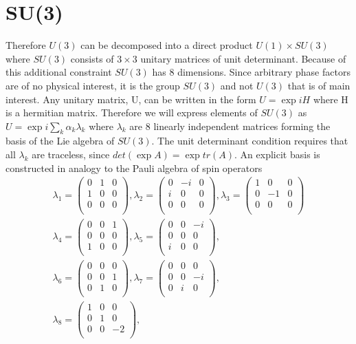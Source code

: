 \documentclass[main.tex]{subfiles}
\begin{document}
\section{SU(3)}
 Therefore $U(3)$ can be decomposed into a direct product $U(1)\times SU(3)$ where $SU(3)$ consists of $3\times3$ unitary matrices of unit determinant. Because of this additional constraint $SU(3)$ has 8 dimensions. Since arbitrary phase factors are of no physical interest, it is the group $SU(3)$ and not $U(3)$ that is of main interest.
Any unitary matrix, U, can be written in the form $U=\exp{iH}$ where H is a hermitian matrix. Therefore we will express elements of $SU(3)$ as $U=\exp{i\sum_k\alpha_k\lambda_k}$
where $\lambda_k$ are 8 linearly independent matrices forming the basis of the Lie algebra of $SU(3)$. The unit determinant condition requires that all $\lambda_k$ are traceless, since $det(\exp{A})=\exp{tr(A)}$. An explicit basis is constructed in analogy to the Pauli algebra of spin operators
\begin{align*}
\lambda_1=\begin{pmatrix}0&1&0\\1&0&0\\0&0&0\\\end{pmatrix}, \lambda_2=\begin{pmatrix}0&-i&0\\i&0&0\\0&0&0\\\end{pmatrix}, \lambda_3=\begin{pmatrix}1&0&0\\0&-1&0\\0&0&0\\\end{pmatrix}\\
\lambda_4=\begin{pmatrix}0&0&1\\0&0&0\\1&0&0\\\end{pmatrix}, \lambda_5=\begin{pmatrix}0&0&-i\\0&0&0\\i&0&0\\\end{pmatrix},\\ \lambda_6=\begin{pmatrix}0&0&0\\0&0&1\\0&1&0\\\end{pmatrix}, \lambda_7=\begin{pmatrix}0&0&0\\0&0&-i\\0&i&0\\\end{pmatrix},\\
\lambda_8=\begin{pmatrix}1&0&0\\0&1&0\\0&0&-2\\\end{pmatrix},\\
\end{align*}
\end{document}
